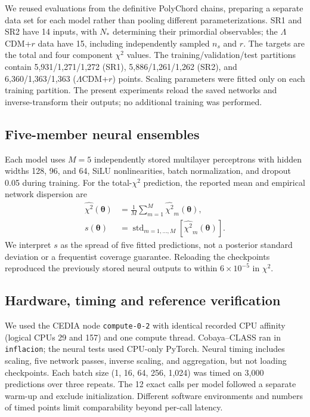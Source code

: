 \documentclass[a4paper,conference,10pt]{IEEEtran}
\begin{document}
We reused evaluations from the definitive PolyChord chains, preparing a separate data set for each model rather than pooling different parameterizations. SR1 and SR2 have 14 inputs, with $N_*$ determining their primordial observables; the $\Lambda$CDM+$r$ data have 15, including independently sampled $n_s$ and $r$. The targets are the total and four component $\chi^2$ values. The training/validation/test partitions contain 5,931/1,271/1,272 (SR1), 5,886/1,261/1,262 (SR2), and 6,360/1,363/1,363 ($\Lambda$CDM+$r$) points. Scaling parameters were fitted only on each training partition. The present experiments reload the saved networks and inverse-transform their outputs; no additional training was performed.

\subsection{Five-member neural ensembles}
Each model uses $M=5$ independently stored multilayer perceptrons with hidden widths 128, 96, and 64, SiLU nonlinearities, batch normalization, and dropout 0.05 during training. For the total-$\chi^2$ prediction, the reported mean and empirical network dispersion are
\begin{align}
\widehat{\chi^2}(\boldsymbol\theta)&=\frac{1}{M}\sum_{m=1}^{M}\widehat{\chi^2}_m(\boldsymbol\theta),\label{eq:mean}\\[-1mm]
 s(\boldsymbol\theta)&=\operatorname{std}_{m=1,\ldots,M}\!\left[\widehat{\chi^2}_m(\boldsymbol\theta)\right].\label{eq:sigma}
\end{align}
We interpret $s$ as the spread of five fitted predictions, not a posterior standard deviation or a frequentist coverage guarantee. Reloading the checkpoints reproduced the previously stored neural outputs to within $6\times10^{-5}$ in $\chi^2$.

\subsection{Hardware, timing and reference verification}
We used the CEDIA node \texttt{compute-0-2} with identical recorded CPU affinity (logical CPUs 29 and 157) and one compute thread. Cobaya--CLASS ran in \texttt{inflacion}; the neural tests used CPU-only PyTorch. Neural timing includes scaling, five network passes, inverse scaling, and aggregation, but not loading checkpoints. Each batch size (1, 16, 64, 256, 1,024) was timed on 3,000 predictions over three repeats. The 12 exact calls per model followed a separate warm-up and exclude initialization. Different software environments and numbers of timed points limit comparability beyond per-call latency.
\end{document}
